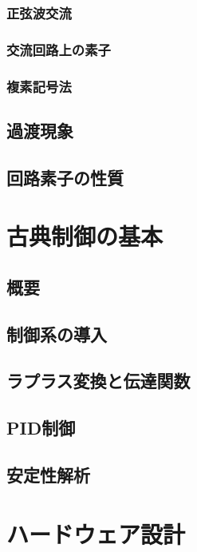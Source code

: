 \documentclass{ltjsreport}
\begin{document}
\subsection{正弦波交流}

\subsection{交流回路上の素子}

\subsection{複素記号法}


\section{過渡現象}

\section{回路素子の性質}




\chapter{古典制御の基本}

\section{概要}

\section{制御系の導入}

\section{ラプラス変換と伝達関数}

\section{PID制御}

\section{安定性解析}



\chapter{ハードウェア設計}
\end{document}

